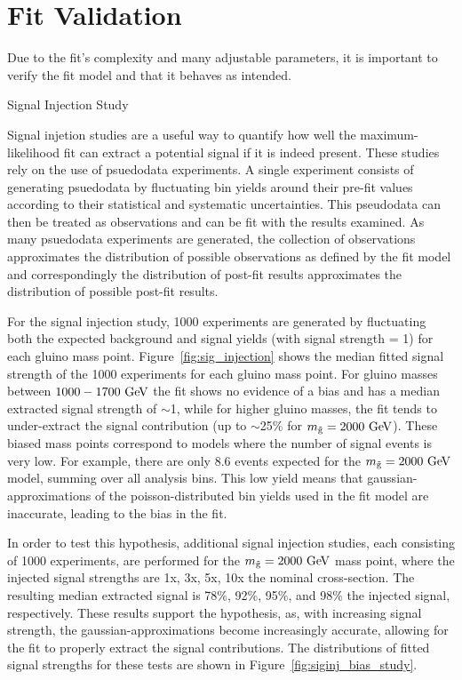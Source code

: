 \chapter{Fit Validation}

Due to the fit's complexity and many adjustable parameters, it is important to verify the fit model and that it behaves as intended.

\begin{section}{Signal Injection Study}

Signal injetion studies are a useful way to quantify how well the maximum-likelihood fit can extract a potential signal if it is indeed present.
These studies rely on the use of psuedodata experiments.
A single experiment consists of generating psuedodata by fluctuating bin yields around their pre-fit values according to their statistical and systematic uncertainties.
This pseudodata can then be treated as observations and can be fit with the results examined.
As many psuedodata experiments are generated, the collection of observations approximates the distribution of possible observations as defined by the fit model and correspondingly the distribution of post-fit results approximates the distribution of possible post-fit results.

For the signal injection study, 1000 experiments are generated by fluctuating both the expected background and signal yields (with signal strength = 1) for each gluino mass point.
Figure~\ref{fig:sig_injection} shows the median fitted signal strength of the 1000 experiments for each gluino mass point.
For gluino masses between $1000 - 1700~\mathrm{Ge\kern -0.1em V}$ the fit shows no evidence of a bias and has a median extracted signal strength of $\sim$1, while for higher gluino masses, the fit tends to under-extract the signal contribution (up to $\sim$25\% for $m_{\tilde{\mathrm{g}}} = 2000~\mathrm{Ge\kern -0.1em V}$).
These biased mass points correspond to models where the number of signal events is very low.
For example, there are only 8.6 events expected for the $m_{\tilde{\mathrm{g}}} = 2000~\mathrm{Ge\kern -0.1em V}$ model, summing over all analysis bins.
This low yield means that gaussian-approximations of the poisson-distributed bin yields used in the fit model are inaccurate, leading to the bias in the fit.

In order to test this hypothesis, additional signal injection studies, each consisting of 1000 experiments, are performed for the $m_{\tilde{\mathrm{g}}} = 2000~\mathrm{Ge\kern -0.1em V}$ mass point, where the injected signal strengths are 1x, 3x, 5x, 10x the nominal cross-section.
The resulting median extracted signal is 78\%, 92\%, 95\%, and 98\% the injected signal, respectively.
These results support the hypothesis, as, with increasing signal strength, the gaussian-approximations become increasingly accurate, allowing for the fit to properly extract the signal contributions.
The distributions of fitted signal strengths for these tests are shown in Figure~\ref{fig:siginj_bias_study}.


\end{section}
